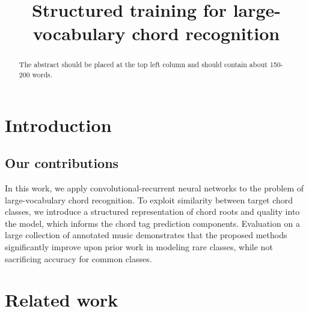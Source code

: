 \documentclass{article}
\title{Structured training for large-vocabulary chord recognition}
\begin{document}
%
\maketitle
%
\begin{abstract}
The abstract should be placed at the top left column and should contain about 150-200 words.
\end{abstract}
%
\section{Introduction}\label{sec:introduction}





\subsection{Our contributions}

In this work, we apply convolutional-recurrent neural networks to the problem of large-vocabulary chord recognition.
To exploit similarity between target chord classes, we introduce a structured representation of chord roots and quality into the model, which informs the chord tag prediction components.
Evaluation on a large collection of annotated music demonstrates that the proposed methods significantly improve upon prior work in modeling rare classes, while not sacrificing accuracy for common classes.

%
\section{Related work}

\cite{korzeniowski2016feature} %

\cite{sigtia2015audio}

\cite{cho2014improved} %

\cite{humphrey2015four}


\cite{ni2012end} %
\end{document}

